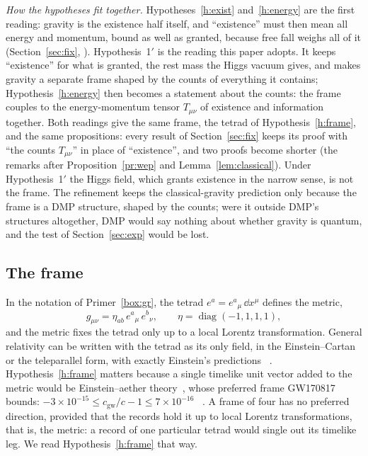 \noindent\emph{How the hypotheses fit together.} Hypotheses~\ref{h:exist} and~\ref{h:energy} are the first reading: gravity is the
existence half itself, and ``existence'' must then mean all energy and momentum, bound as well as granted, because free fall weighs all of
it (Section~\ref{sec:fix}, ). Hypothesis~1$'$ is the reading this paper adopts. It keeps ``existence'' for what is granted, the
rest mass the Higgs vacuum gives, and makes gravity a separate frame shaped by the counts of everything it contains; Hypothesis~\ref{h:energy}
then becomes a statement about the counts: the frame couples to the energy-momentum tensor $T_{\mu\nu}$ of existence and information
together. Both readings give the same frame, the tetrad of Hypothesis~\ref{h:frame}, and the same propositions: every result of
Section~\ref{sec:fix} keeps its proof with ``the counts $T_{\mu\nu}$'' in place of ``existence'', and two proofs become shorter (the remarks
after Proposition~\ref{pr:wep} and Lemma~\ref{lem:classical}). Under Hypothesis~1$'$ the Higgs field, which grants existence in the narrow
sense, is not the frame. The refinement
keeps the classical-gravity prediction only because the frame is a DMP structure, shaped by the counts; were it outside DMP's structures
altogether, DMP would say nothing about whether gravity is quantum, and the test of Section~\ref{sec:exp} would be lost.


\subsection{The frame}

In the notation of Primer~\ref{box:gr}, the tetrad $e^a=e^a{}_\mu\,\dd x^\mu$ defines the metric,
\begin{equation}\label{eq:tetrad}
g_{\mu\nu}=\eta_{ab}\,e^a{}_\mu\,e^b{}_\nu,\qquad \eta=\operatorname{diag}(-1,1,1,1),
\end{equation}
and the metric fixes the tetrad only up to a local Lorentz transformation. General relativity can be written with the tetrad as its only
field, in the Einstein--Cartan or the teleparallel form, with exactly Einstein's predictions~\cite{aldrovandi} \tagP. Hypothesis~\ref{h:frame}
matters because a single timelike unit vector added to the metric would be Einstein--aether theory~\cite{aether}, whose preferred frame
GW170817 bounds: $-3\times10^{-15}\le c_{\text{gw}}/c-1\le7\times10^{-16}$~\cite{gw170817} . A frame of four has no preferred
direction, provided that the records hold it up to local Lorentz transformations, that is, the metric: a record of one particular tetrad
would single out its timelike leg. We read Hypothesis~\ref{h:frame} that way.

